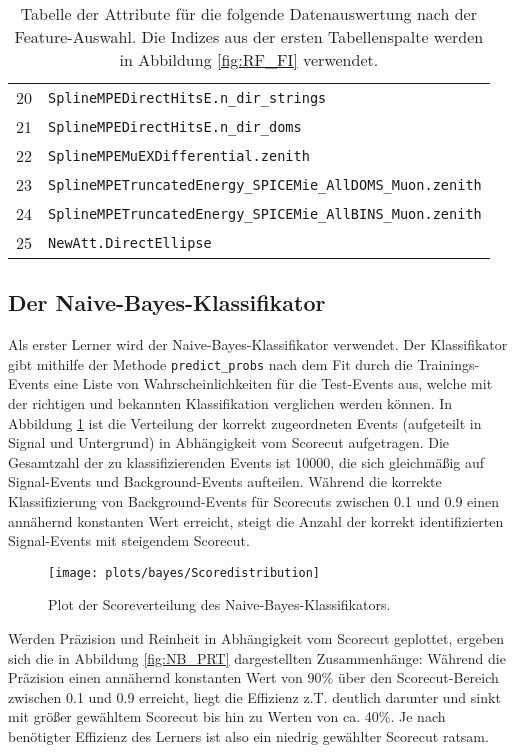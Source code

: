 \begin{table}[]
\begin{tabular}{ll}
		20    & \texttt{SplineMPEDirectHitsE.n\_dir\_strings}                     \\
		21    & \texttt{SplineMPEDirectHitsE.n\_dir\_doms}                        \\
		22    & \texttt{SplineMPEMuEXDifferential.zenith}                         \\
		23    & \texttt{SplineMPETruncatedEnergy\_SPICEMie\_AllDOMS\_Muon.zenith} \\
		24    & \texttt{SplineMPETruncatedEnergy\_SPICEMie\_AllBINS\_Muon.zenith} \\
		25    & \texttt{NewAtt.DirectEllipse}                                     \\ \bottomrule
	\end{tabular}
	\bigskip
	\caption{Tabelle der Attribute für die folgende Datenauswertung nach der Feature-Auswahl. Die Indizes aus der ersten Tabellenspalte werden in Abbildung \ref{fig:RF_FI} verwendet.}
	\label{tab:FSel}
\end{table}



\subsection{Der Naive-Bayes-Klassifikator}

Als erster Lerner wird der Naive-Bayes-Klassifikator verwendet. Der Klassifikator gibt mithilfe der Methode \texttt{predict\_probs} nach dem Fit durch die Trainings-Events eine Liste von Wahrscheinlichkeiten für die Test-Events aus, welche mit der richtigen und bekannten Klassifikation verglichen werden können. In Abbildung \ref{fig:NB_SD} ist die Verteilung der korrekt zugeordneten Events (aufgeteilt in Signal und Untergrund) in Abhängigkeit vom Scorecut aufgetragen. Die Gesamtzahl der zu klassifizierenden Events ist 10000, die sich gleichmäßig auf Signal-Events und Background-Events aufteilen. Während die korrekte Klassifizierung von Background-Events für Scorecuts zwischen 0.1 und 0.9 einen annähernd konstanten Wert erreicht, steigt die Anzahl der korrekt identifizierten Signal-Events mit steigendem Scorecut.

\begin{figure}
	\centering
	\texttt{[image: plots/bayes/Scoredistribution]}
	\caption{Plot der Scoreverteilung des Naive-Bayes-Klassifikators.}
	\label{fig:NB_SD}
\end{figure}

Werden Präzision und Reinheit in Abhängigkeit vom Scorecut geplottet, ergeben sich die in Abbildung \ref{fig:NB_PRT} dargestellten Zusammenhänge: Während die Präzision einen annähernd konstanten Wert von 90\% über den Scorecut-Bereich zwischen 0.1 und 0.9 erreicht, liegt die Effizienz z.T. deutlich darunter und sinkt mit größer gewähltem Scorecut bis hin zu Werten von ca. 40\%. Je nach benötigter Effizienz des Lerners ist also ein niedrig gewählter Scorecut ratsam.

